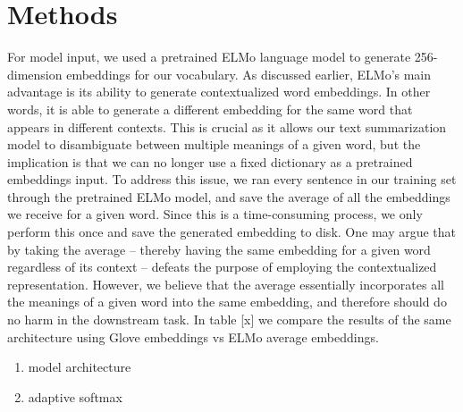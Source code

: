\section{Methods}
\label{sec: method}


For model input, we used a pretrained ELMo language model \cite{peters2018deep} to generate 256-dimension embeddings for our vocabulary. As discussed earlier, ELMo's main advantage is its ability to generate contextualized word embeddings. In other words, it is able to generate a different embedding for the same word that appears in different contexts. This is crucial as it allows our text summarization model to disambiguate between multiple meanings of a given word, but the implication is that we can no longer use a fixed dictionary as a pretrained embeddings input. To address this issue, we ran every sentence in our training set through the pretrained ELMo model, and save the average of all the embeddings we receive for a given word. Since this is a time-consuming process, we only perform this once and save the generated embedding to disk. One may argue that by taking the average -- thereby having the same embedding for a given word regardless of its context -- defeats the purpose of employing the contextualized representation. However, we believe that the average essentially incorporates all the meanings of a given word into the same embedding, and therefore should do no harm in the downstream task.  In table [x]  we compare the results of the same architecture using Glove embeddings vs ELMo average embeddings. 
\begin{enumerate}
\item model architecture
\item adaptive softmax 
\end{enumerate} 